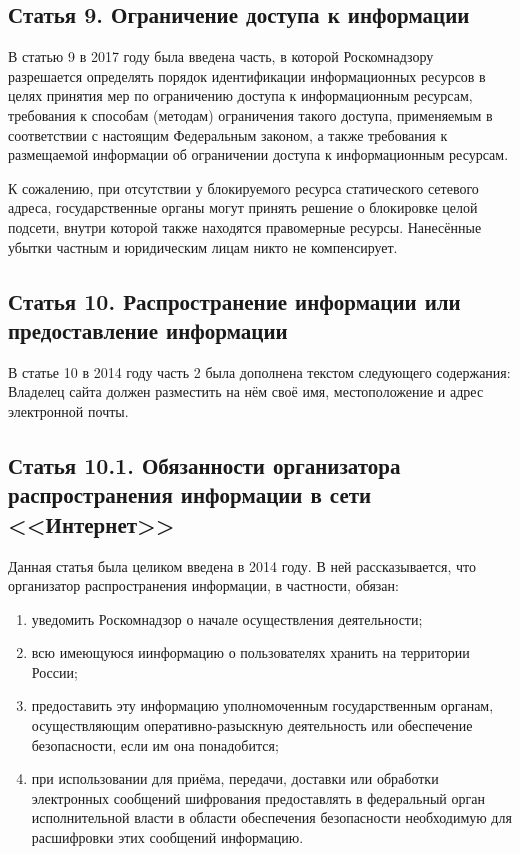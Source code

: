 \subsection{Статья 9. Ограничение доступа к информации}

В статью 9 в 2017 году была введена часть, в которой Роскомнадзору разрешается определять порядок идентификации информационных ресурсов в целях принятия мер по ограничению доступа к информационным ресурсам, требования к способам (методам) ограничения такого доступа, применяемым в соответствии с настоящим Федеральным законом, а также требования к размещаемой информации об ограничении доступа к информационным ресурсам.


К сожалению, при отсутствии у блокируемого ресурса статического сетевого адреса, государственные органы могут принять решение о блокировке целой подсети, внутри которой также находятся правомерные ресурсы. Нанесённые убытки частным и юридическим лицам никто не компенсирует.

\subsection{Статья 10. Распространение информации или предоставление информации}

В статье 10 в 2014 году часть 2 была дополнена текстом следующего содержания: Владелец сайта должен разместить на нём своё имя, местоположение и адрес электронной почты.


\subsection{Статья 10.1. Обязанности организатора распространения информации в сети <<Интернет>>}

Данная статья была целиком введена в 2014 году. В ней рассказывается, что организатор распространения информации, в частности, обязан:

\begin{enumerate}
	\item уведомить Роскомнадзор о начале осуществления деятельности;
	\item всю имеющуюся иинформацию о пользователях хранить на территории России;
	\item предоставить эту информацию уполномоченным государственным органам, осуществляющим оперативно-разыскную деятельность или обеспечение безопасности, если им она понадобится;
	\item при использовании для приёма, передачи, доставки или обработки электронных сообщений шифрования предоставлять в федеральный орган исполнительной власти в области обеспечения безопасности необходимую для расшифровки этих сообщений информацию.
\end{enumerate}


